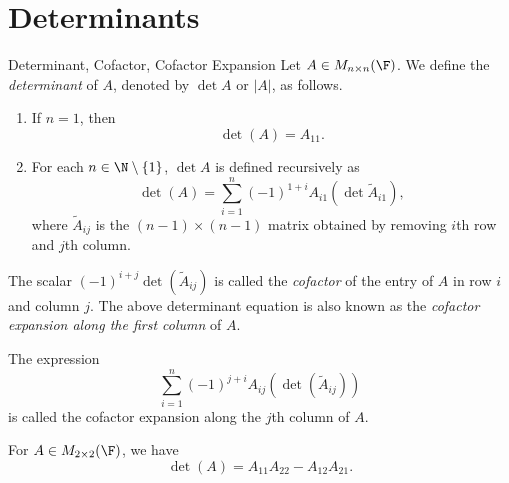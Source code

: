 \documentclass[linearalgebra]{subfiles}
\begin{document}

    \section{Determinants}

    \begin{definition}{Determinant, Cofactor, Cofactor Expansion}{}
        Let $A\in M_{n\times n}(\F)$. We define the \emph{determinant} of $A$, denoted by $\det A$ or $|A|$, as follows.
        \begin{enumerate}
            \item If $n=1$, then
            \begin{equation*}
                \det(A) = A_{11}.
            \end{equation*}
            \item For each $n\in \N\setminus \left\lbrace 1 \right\rbrace$, $\det A$ is defined recursively as
            \begin{equation*}
                \det(A) = \sum^{n}_{i=1} (-1)^{1+i} A_{i1} \left( \det \widetilde{A}_{i1} \right), 
            \end{equation*}
            where $\widetilde{A}_{ij}$ is the $(n-1)\times (n-1)$ matrix obtained by removing $i$th row and $j$th column.
        \end{enumerate}
        The scalar $(-1)^{i+j} \det \left(\widetilde{A}_{ij}\right)$ is called the \emph{cofactor} of the entry of $A$ in row $i$ and column $j$. The above determinant equation is also known as the \emph{cofactor expansion along the first column} of $A$.
    \end{definition}

    \begin{remark}
        The expression
        \begin{equation*}
            \sum^n_{i=1} (-1)^{j+i}A_{ij} \left( \det \left(\widetilde{A}_{ij}\right) \right)
        \end{equation*}
        is called the cofactor expansion along the $j$th column of $A$.
    \end{remark}

    \begin{remark}
        For $A\in M_{2\times 2}(\F)$, we have
        \begin{equation*}
            \det (A) = A_{11}A_{22} - A_{12}A_{21}.
        \end{equation*}
    \end{remark}
\end{document}
